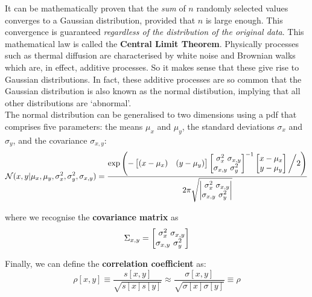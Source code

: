 \begin{refsection}
It can be mathematically proven that the \emph{sum} of $n$ randomly
selected values converges to a Gaussian distribution, provided that
$n$ is large enough. This convergence is guaranteed \textit{regardless
  of the distribution of the original data}.  This mathematical law is
called the \textbf{Central Limit Theorem}. Physically processes such
as thermal diffusion are characterised by white noise and Brownian
walks which are, in effect, additive processes.  So it makes sense
that these give rise to Gaussian distributions. In fact, these
additive processes are so common that the Gaussian distribution is
also known as the normal distibution, implying that all other
distributions are `abnormal'.\\

The normal distribution can be generalised to two dimensions using a
pdf that comprises five parameters: the means $\mu_x$ and $\mu_y$, the
standard deviations $\sigma_x$ and $\sigma_y$, and the covariance
$\sigma_{x,y}$:
\begin{equation}
\mathcal{N}(x,y|\mu_x,\mu_y,\sigma_x^2,\sigma_y^2,\sigma_{x,y}) = \frac{
\exp\left(-
\left[\begin{array}{@{}cc@{}}
(x-\mu_x) & (y-\mu_y)
\end{array}\right]
\left[\begin{array}{@{}c@{}c@{}}
\sigma^2_x & \sigma_{x,y}\\
\sigma_{x,y} & \sigma^2_y
\end{array}\right]^{-1}
\left[\begin{array}{@{}c@{}}
x-\mu_x\\
y-\mu_y
\end{array}\right] \biggl/ 2
\right)
}{2\pi\sqrt{
\left|\begin{array}{@{}c@{}c@{}}
\sigma^2_x & \sigma_{x,y}\\
\sigma_{x,y} & \sigma^2_y
\end{array}\right|
}}
\label{eq:2dgauss}
\end{equation}

\noindent where we recognise the \textbf{covariance matrix} as
\[\Sigma_{x,y} = 
\left[\begin{array}{@{}c@{}c@{}}
\sigma^2_x & \sigma_{x,y}\\
\sigma_{x,y} & \sigma^2_y
\end{array}\right]
\]

Finally, we can define the \textbf{correlation coefficient} as:
\begin{equation}
  \rho[x,y] \equiv \frac{s[x,y]}{\sqrt{s[x]s[y]}} 
  \approx 
  \frac{\sigma[x,y]}{\sqrt{\sigma[x]\sigma[y]}}
  \equiv \rho
  \label{eq:rho}
\end{equation}


\end{refsection}
